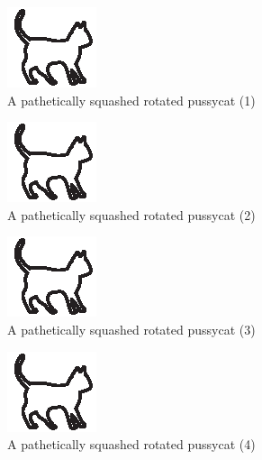 \documentclass[twoside]{report}
\begin{document}
\begin{figure}
  \centerline{\includegraphics[width=.8\textheight,height=.4\textwidth]{cat}}
\caption{A pathetically squashed rotated pussycat (1)}
\end{figure}

\begin{figure}
  \centerline{\includegraphics[width=.8\textheight,height=.4\textwidth]{cat}}
\caption{A pathetically squashed rotated pussycat (2)}
\end{figure}

\begin{figure}
  \centerline{\includegraphics[width=.8\textheight,height=.4\textwidth]{cat}}
\caption{A pathetically squashed rotated pussycat (3)}
\end{figure}

\begin{figure}
  \centerline{\includegraphics[width=.8\textheight,height=.4\textwidth]{cat}}
\caption{A pathetically squashed rotated pussycat (4)}
\end{figure}
\end{document}
